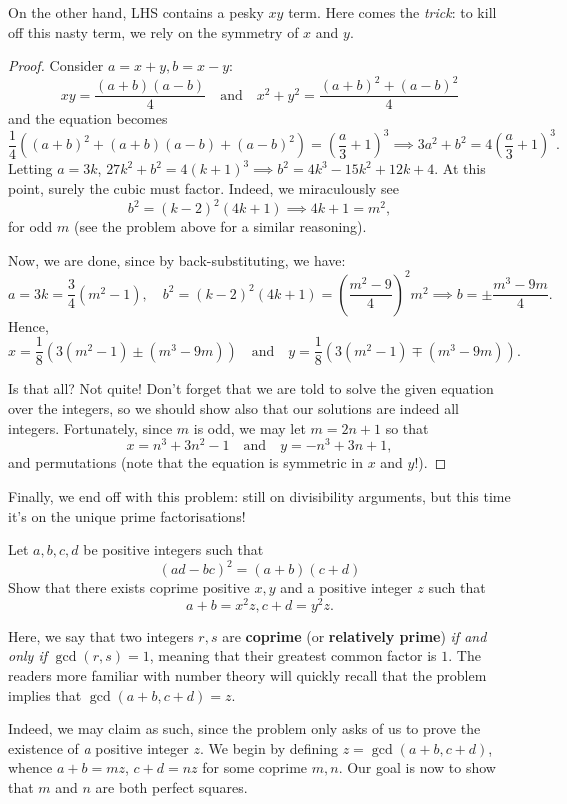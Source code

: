 \documentclass[../jarvis.tex]{subfiles}
\begin{document}
On the other hand, LHS contains a pesky $xy$ term. Here comes the \textit{trick}: to kill off this nasty term, we rely on the symmetry of $x$ and $y$. 
\begin{proof}
    Consider $a=x+y, b=x-y$:
    $$xy= \frac{(a+b)(a-b)}{4} \quad\text{and}\quad x^2+y^2= \frac{(a+b)^2+(a-b)^2}{4}$$
and the equation becomes
$$\frac{1}{4}\left((a+b)^2+(a+b)(a-b)+(a-b)^2\right)=\left(\frac{a}{3}+1\right)^3 \implies 3a^2+b^2=4\left(\frac{a}{3}+1\right)^3.$$
Letting $a=3k$, $27k^2+b^2=4(k+1)^3 \implies b^2=4k^3-15k^2+12k+4$.
At this point, surely the cubic must factor. Indeed, we miraculously see
$$b^2=(k-2)^2(4k+1) \implies 4k+1=m^2,$$
for odd $m$ (see the problem above for a similar reasoning).

Now, we are done, since by back-substituting, we have:
$$a=3k=\frac{3}{4}(m^2-1), \quad b^2=(k-2)^2(4k+1)=\left(\frac{m^2-9}{4}\right)^2m^2 \implies b=\pm \frac{m^3-9m}{4}.$$
Hence,
$$x=\frac{1}{8}\left(3(m^2-1)\pm(m^3-9m)\right)\quad\text{and}\quad y=\frac{1}{8}\left(3(m^2-1)\mp(m^3-9m)\right).$$

Is that all? Not quite! Don't forget that we are told to solve the given equation over the integers, so we should show also that our solutions are indeed all integers. Fortunately, since $m$ is odd, we may let $m=2n+1$ so that
$$\boxed{x=n^3+3n^2-1\quad\text{and}\quad y=-n^3+3n+1},$$
and permutations (note that the equation is symmetric in $x$ and $y$!).
\end{proof}

Finally, we end off with this problem: still on divisibility arguments, but this time it's on the unique prime factorisations!
\begin{example}[2021 H3 Math P1 Q4]
Let $a,b,c,d$ be positive integers such that
\begin{equation}\label{5.3-det}
    (ad-bc)^2=(a+b)(c+d)
\end{equation}
Show that there exists coprime positive $x,y$ and a positive integer $z$ such that
$$a+b=x^2z, c+d=y^2z.$$
\end{example}
Here, we say that two integers $r,s$ are \textbf{coprime} (or \textbf{relatively prime}) \textit{if and only if} $\gcd(r,s)=1$, meaning that their greatest common factor is $1$. The readers more familiar with number theory will quickly recall that the problem implies that $\gcd(a+b, c+d)=z$.

Indeed, we may claim as such, since the problem only asks of us to prove the existence of \textit{a} positive integer $z$. We begin by defining $z=\gcd(a+b, c+d)$, whence $a+b=mz$, $c+d=nz$ for some coprime $m, n$. Our goal is now to show that $m$ and $n$ are both perfect squares.
\end{document}
